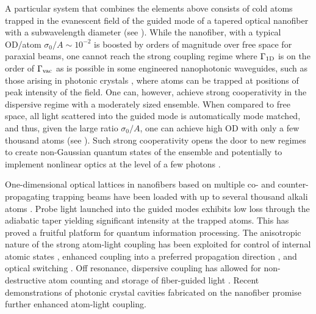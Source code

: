 \documentclass[preprint, aps,pra,onecolumn]{revtex4-1} %
\newcommand{\oneD}{{\rm 1D}}
\newcommand{\vac}{{\rm vac}}
\begin{document}
A particular system that combines the elements above consists of cold atoms trapped in the evanescent field of the guided mode of a tapered optical nanofiber with a subwavelength diameter \cite{vetsch_optical_2010, lacroute_state-insensitive_2012, balykin_quantum_2014} (see ).  
While the nanofiber, with a typical OD/atom $\sigma_0/A \sim  10^{-2}$ is boosted by orders of magnitude over free space for paraxial beams, one cannot reach the strong coupling regime where $\Gamma_{\oneD}$ is on the order of $\Gamma_{\vac}$ as is possible in some engineered nanophotonic waveguides, such as those arising in photonic crystals \cite{hung_trapped_2013}, where atoms can be trapped at positions of peak intensity of the field.  
One can, however, achieve strong cooperativity in the dispersive regime with a moderately sized ensemble.  When compared to free space, all light scattered into the guided mode is automatically mode matched, and thus, given the large ratio $\sigma_0/A$, one can achieve high OD with only a few thousand atoms (see ).  
Such strong cooperativity opens the door to new regimes to create non-Gaussian quantum states of the ensemble \cite{dubost_efficient_2012} and potentially to implement nonlinear optics at the level of a few photons \cite{spillane_observation_2008, pittman_ultralow-power_2013, oshea_fiber-optical_2013}.



One-dimensional optical lattices in nanofibers based on multiple co- and counter-propagating trapping beams have been loaded with up to several thousand alkali atoms \cite{vetsch_optical_2010, lacroute_state-insensitive_2012}.
Probe light launched into the guided modes exhibits low loss through the adiabatic taper \cite{hoffman_ultrahigh_2014} yielding significant intensity at the trapped atoms.
This has proved a fruitful platform for quantum information processing.  
The anisotropic nature of the strong atom-light coupling has been exploited for control of internal atomic states \cite{mitsch_exploiting_2014}, enhanced coupling into a preferred propagation direction \cite{petersen_chiral_2014, mitsch_quantum_2014}, and optical switching \cite{oshea_fiber-optical_2013}. 
Off resonance, dispersive coupling has allowed for non-destructive atom counting \cite{dawkins_dispersive_2011, beguin_generation_2014} 
and storage of fiber-guided light \cite{gouraud_demonstration_2015, sayrin_storage_2015}.
Recent demonstrations of photonic crystal cavities fabricated on the nanofiber \cite{wuttke_nanofiber_2012, nayak_optical_2014, schell_highly_2015} promise further enhanced atom-light coupling.
\end{document}
